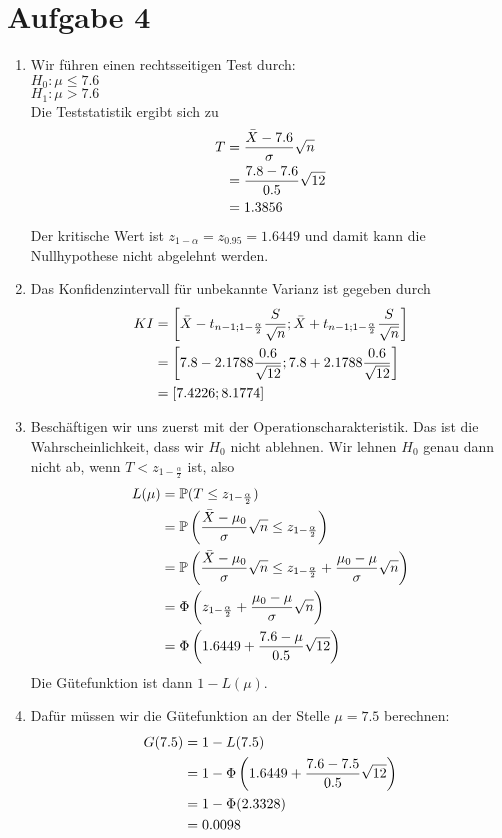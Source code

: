 \documentclass{article}
\begin{document}
	\section*{Aufgabe 4}
	\begin{enumerate}[label=(\alph*)]
		\item Wir führen einen rechtsseitigen Test durch: \\
		$H_0: \mu \le 7.6$ \\
		$H_1: \mu > 7.6$ \\
		Die Teststatistik ergibt sich zu
		\begin{align}
			T &= \frac{\bar{X} - 7.6}{\sigma}\sqrt{n} \notag \\
			&= \frac{7.8-7.6}{0.5}\sqrt{12} \notag \\
			&= 1.3856 \notag
		\end{align}
		Der kritische Wert ist $z_{1-\alpha}= z_{0.95}=1.6449$ und damit kann die Nullhypothese nicht abgelehnt werden.
		\item Das Konfidenzintervall für unbekannte Varianz ist gegeben durch
		\begin{align}
			KI &= \left[\bar{X} - t_{n-1;1-\frac{\alpha}{2}}\frac{S}{\sqrt{n}}; \bar{X} + t_{n-1;1-\frac{\alpha}{2}}\frac{S}{\sqrt{n}}\right] \notag \\
			&= \left[7.8 - 2.1788\frac{0.6}{\sqrt{12}}; 7.8 + 2.1788\frac{0.6}{\sqrt{12}}\right] \notag \\
			&= [7.4226;8.1774] \notag
		\end{align}
		\item Beschäftigen wir uns zuerst mit der Operationscharakteristik. Das ist die Wahrscheinlichkeit, dass wir $H_0$ nicht ablehnen. Wir lehnen $H_0$ genau dann nicht ab, wenn $T < z_{1-\frac{\alpha}{2}}$ ist, also
		\begin{align}
			L(\mu) &= \mathbb{P}(T \le z_{1-\frac{\alpha}{2}}) \notag \\
			&= \mathbb{P}\left(\frac{\bar{X}-\mu_0}{\sigma}\sqrt{n} \le z_{1-\frac{\alpha}{2}}\right) \notag \\
			&= \mathbb{P}\left(\frac{\bar{X}-\mu_0}{\sigma}\sqrt{n} \le z_{1-\frac{\alpha}{2}} + \frac{\mu_0-\mu}{\sigma}\sqrt{n}\right) \notag \\
			&= \Phi\left(z_{1-\frac{\alpha}{2}} + \frac{\mu_0-\mu}{\sigma}\sqrt{n}\right) \notag \\
			&= \Phi\left(1.6449 + \frac{7.6-\mu}{0.5}\sqrt{12}\right) \notag
		\end{align}
		Die Gütefunktion ist dann $1-L(\mu)$.
		\item Dafür müssen wir die Gütefunktion an der Stelle $\mu=7.5$ berechnen:
		\begin{align}
			G(7.5) &= 1- L(7.5) \notag \\
			&= 1- \Phi\left(1.6449 + \frac{7.6-7.5}{0.5}\sqrt{12}\right) \notag \\
			&= 1- \Phi(2.3328) \notag \\
			&= 0.0098 \notag
		\end{align}
	\end{enumerate}
\end{document}
